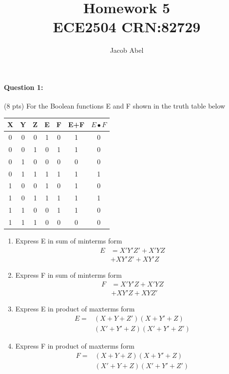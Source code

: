 \documentclass[12pt,letterpaper,titlepage]{report}
\author{Jacob Abel}
\title{%
	Homework 5
	\\\large ECE2504 CRN:82729
}
\begin{document}
\maketitle
\begin{raggedright}
\raggedcolumns
\begin{multicols*}{2}
\paragraph{Question 1:}
(8 pts) For the Boolean functions E and F shown in the truth table below 

\begin{center}
\begin{tabular}{ c c c | c c | c | c }\hline
X & Y & Z & E & F & E+F &$E\bullet F$ \\\hline
0 & 0 & 0 & 1 & 0 & 1   & 0          \\\hline
0 & 0 & 1 & 0 & 1 & 1   & 0          \\\hline
0 & 1 & 0 & 0 & 0 & 0   & 0          \\\hline
0 & 1 & 1 & 1 & 1 & 1   & 1          \\\hline
1 & 0 & 0 & 1 & 0 & 1   & 0          \\\hline
1 & 0 & 1 & 1 & 1 & 1   & 1          \\\hline
1 & 1 & 0 & 0 & 1 & 1   & 0          \\\hline
1 & 1 & 1 & 0 & 0 & 0   & 0          \\\hline
\end{tabular}
\end{center}
\begin{enumerate} [label=\alph*)]
\item Express E in sum of minterms form
\begin{align*}
E&= X'Y'Z'+X'YZ\\&+XY'Z'+XY'Z
\end{align*}
\item Express F in sum of minterms form
\begin{align*}
F&= X'Y'Z+X'YZ\\&+XY'Z+XYZ'
\end{align*}
\item Express E in product of maxterms form
\begin{align*}
E= &(X+Y+Z')(X+Y'+Z)\\&(X'+Y'+Z)(X'+Y'+Z')
\end{align*}

\item Express F in product of maxterms form
\begin{align*}
F= &(X+Y+Z)(X+Y'+Z)\\&(X'+Y+Z)(X'+Y'+Z')
\end{align*}


\end{enumerate}
\end{multicols*}
\end{raggedright}
\end{document}
